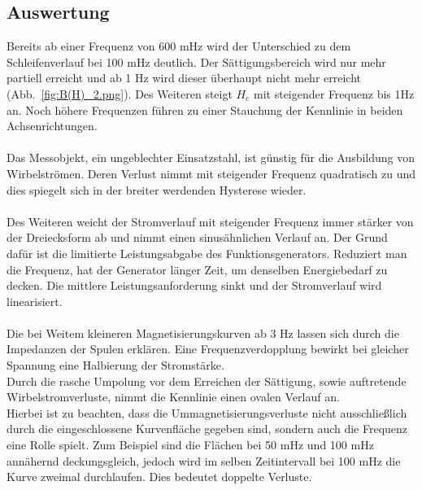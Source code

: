 \documentclass[a4paper,twoside,12pt,DIV=13,BCOR=5mm,numbers=noenddot,cleardoublepage=empty]{scrbook}
\begin{document}
        \subsection{Auswertung}
        Bereits ab einer Frequenz von 600 mHz wird der Unterschied zu dem 
        Schleifenverlauf bei 100 mHz deutlich. Der S\"attigungsbereich wird nur 
        mehr partiell erreicht und ab 1 Hz wird dieser \"uberhaupt nicht mehr 
        erreicht (Abb.~\ref{fig:B(H)_2.png}). Des Weiteren steigt $H_\mathrm{c}$ mit steigender Frequenz 
        bis 1Hz an.  Noch h\"ohere Frequenzen f\"uhren zu einer Stauchung der 
        Kennlinie in beiden Achsenrichtungen.
        \\
        \\
        Das Messobjekt, ein ungeblechter Einsatzstahl, ist g\"unstig f\"ur die 
        Ausbildung von Wirbelstr\"omen. Deren Verlust nimmt mit steigender Frequenz 
        quadratisch zu und dies spiegelt sich in der breiter werdenden Hysterese 
        wieder.
        \\
        \\
        Des Weiteren weicht der Stromverlauf mit steigender Frequenz immer 
        st\"arker von der Dreiecksform ab und nimmt einen sinus\"ahnlichen Verlauf an. 
        Der Grund daf\"ur ist die limitierte Leistungsabgabe des Funktionsgenerators. 
        Reduziert man die Frequenz, hat der Generator l\"anger Zeit, um denselben 
        Energiebedarf zu decken. Die mittlere Leistungsanforderung sinkt und der 
        Stromverlauf wird linearisiert.
        \\
        \\
        Die bei Weitem kleineren Magnetisierungskurven ab 3 Hz lassen sich 
        durch die Impedanzen der Spulen erkl\"aren. Eine Frequenzverdopplung 
        bewirkt bei gleicher Spannung eine Halbierung der Stromst\"arke.
        \\
        Durch die rasche Umpolung vor dem Erreichen der S\"attigung, sowie 
        auftretende Wirbelstromverluste, nimmt die Kennlinie einen ovalen 
        Verlauf an.
        \\
        Hierbei ist zu beachten, dass die Ummagnetisierungsverluste nicht 
        ausschlie\ss{}lich durch die eingeschlossene Kurvenfl\"ache gegeben 
        sind, sondern auch die Frequenz eine Rolle spielt. Zum Beispiel sind 
        die Fl\"achen bei 50 mHz und 100 mHz ann\"ahernd deckungsgleich, jedoch 
        wird im selben Zeitintervall bei 100 mHz die Kurve zweimal 
        durchlaufen. Dies bedeutet doppelte Verluste.
\end{document}
